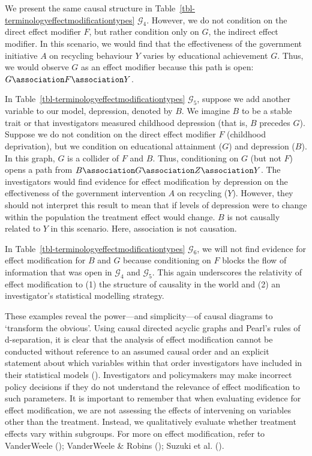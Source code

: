 \documentclass[
  single column]{article}
\begin{document}
We present the same causal structure in
Table~\ref{tbl-terminologyeffectmodificationtypes} \(\mathcal{G}_4\).
However, we do not condition on the direct effect modifier \(F\), but
rather condition only on \(G\), the indirect effect modifier. In this
scenario, we would find that the effectiveness of the government
initiative \(A\) on recycling behaviour \(Y\) varies by educational
achievement \(G\). Thus, we would observe \(G\) as an effect modifier
because this path is open: \(G \association F \association Y\).

In Table~\ref{tbl-terminologyeffectmodificationtypes} \(\mathcal{G}_5\),
suppose we add another variable to our model, depression, denoted by
\(B\). We imagine \(B\) to be a stable trait or that investigators
measured childhood depression (that is, \(B\) precedes \(G\)). Suppose
we do not condition on the direct effect modifier \(F\) (childhood
deprivation), but we condition on educational attainment (\(G\)) and
depression (\(B\)). In this graph, \(G\) is a collider of \(F\) and
\(B\). Thus, conditioning on \(G\) (but not \(F\)) opens a path from
\(B \association G \association Z \association Y\). The investigators
would find evidence for effect modification by depression on the
effectiveness of the government intervention \(A\) on recycling (\(Y\)).
However, they should not interpret this result to mean that if levels of
depression were to change within the population the treatment effect
would change. \(B\) is not causally related to \(Y\) in this scenario.
Here, association is not causation.

In Table~\ref{tbl-terminologyeffectmodificationtypes} \(\mathcal{G}_6\),
we will not find evidence for effect modification for \(B\) and \(G\)
because conditioning on \(F\) blocks the flow of information that was
open in \(\mathcal{G}_4\) and \(\mathcal{G}_5\). This again underscores
the relativity of effect modification to (1) the structure of causality
in the world and (2) an investigator's statistical modelling strategy.

These examples reveal the power---and simplicity---of causal diagrams to
`transform the obvious'. Using causal directed acyclic graphs and
Pearl's rules of d-separation, it is clear that the analysis of effect
modification cannot be conducted without reference to an assumed causal
order and an explicit statement about which variables within that order
investigators have included in their statistical models
(). Investigators and
policymakers may make incorrect policy decisions if they do not
understand the relevance of effect modification to such parameters. It
is important to remember that when evaluating evidence for effect
modification, we are not assessing the effects of intervening on
variables other than the treatment. Instead, we qualitatively evaluate
whether treatment effects vary within subgroups. For more on effect
modification, refer to VanderWeele
(); VanderWeele \& Robins
(); Suzuki et al.
().
\end{document}
